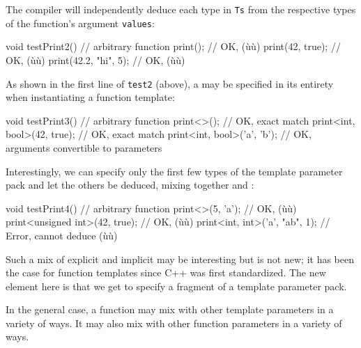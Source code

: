 \noindent The compiler will independently deduce each type in \lstinline!Ts! from the
respective types of the function's argument \lstinline!values!:

\begin{emcppslisting}[emcppsbatch=e16]
void testPrint2()  // arbitrary function
{
    print();               // OK, (ù{}ù)
    print(42, true);       // OK, (ù{}ù)
    print(42.2, "hi", 5);  // OK, (ù{}ù)
}
\end{emcppslisting}
    

\noindent As shown in the first line of \lstinline!test2! (above), a  may be specified in its entirety when instantiating a
function template:

\begin{emcppslisting}[emcppsbatch=e16]
void testPrint3()  // arbitrary function
{
    print<>();                    // OK, exact match
    print<int, bool>(42, true);   // OK, exact match
    print<int, bool>('a', 'b');   // OK, arguments convertible to parameters
}
\end{emcppslisting}
    

\noindent Interestingly, we can specify only the first few types of the template
parameter pack and let the others be deduced, mixing together
 and :

\begin{emcppslisting}[emcppsbatch=e16]
void testPrint4()  // arbitrary function
{
    print<>(5, 'a');                 // OK, (ù{}ù)
    print<unsigned int>(42, true);   // OK, (ù{}ù)
    print<int, int>('a', "ab", 1);   // Error, cannot deduce (ù{}ù)
}
\end{emcppslisting}
    

\noindent Such a mix of explicit and implicit may be interesting but is not new;
it has been the case for function templates since C++ was first
standardized. The new element here is that we get to specify a fragment
of a template parameter pack.

In the general case, a function may mix  with other template parameters in a variety of ways. It may also
mix  with other function parameters in
a variety of ways.

